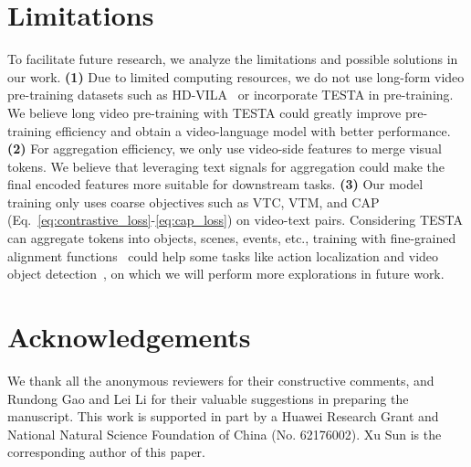 \documentclass[11pt]{article}
\newcommand{\modelname}{TESTA\xspace}
\begin{document}
\section*{Limitations}
To facilitate future research, we analyze the limitations and possible solutions in our work. 
\textbf{(1)} Due to limited computing resources, we do not use long-form video pre-training datasets such as HD-VILA~\cite{Xue2021AdvancingHV} or incorporate \modelname in pre-training. We believe long video pre-training with \modelname could greatly improve pre-training efficiency and obtain a video-language model with better performance. 
\textbf{(2)} For aggregation efficiency, we only use video-side features to merge visual tokens. We believe that leveraging text signals for aggregation could make the final encoded features more suitable for downstream tasks. 
\textbf{(3)} Our model training only uses coarse objectives such as VTC, VTM, and CAP (Eq.~\eqref{eq:contrastive_loss}-\eqref{eq:cap_loss}) on video-text pairs. Considering \modelname can aggregate tokens into objects, scenes, events, etc., training with fine-grained alignment functions~\citep{Ren2021LearningRA, Wang2022DisentangledRL} could help some tasks like action localization and video object detection~\citep{Zhukov2019CrossTaskWS, Real2017YouTubeBoundingBoxesAL}, on which we will perform more explorations in future work. 


\section*{Acknowledgements}
We thank all the anonymous reviewers for their constructive comments, and Rundong Gao and Lei Li for their valuable suggestions in preparing the manuscript. 
This work is supported in part by a Huawei Research Grant and National Natural Science Foundation of China (No. 62176002). Xu Sun is the corresponding author of this paper. 









\appendix
\label{sec:appendix}
\end{document}
